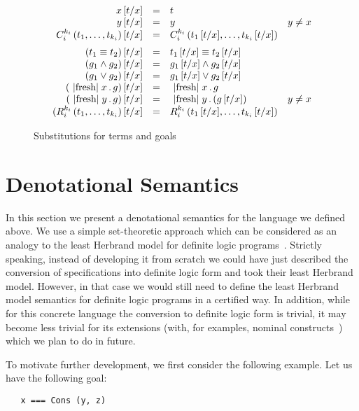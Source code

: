 \begin{figure}[t]
\[
\begin{array}{rcll}
  x\,[t/x] &=& t &\\
  y\,[t/x] &=& y & y\ne x\\
  C_i^{k_i}\,(t_1,\dots,t_{k_i})\,[t/x]&=&C_i^{k_i}\,(t_1\,[t/x],\dots,t_{k_i}\,[t/x])&\\[2mm]
  (t_1 \equiv t_2)\,[t/x]&=&t_1\,[t/x] \equiv t_2\,[t/x]&\\
  (g_1 \wedge g_2)\,[t/x]&=&g_1\,[t/x] \wedge g_2\,[t/x]&\\
  (g_1 \vee g_2)\,[t/x]&=&g_1\,[t/x] \vee g_2\,[t/x]&\\
  (\mbox{\lstinline|fresh|}\;x\,.\,g)\,[t/x]&=&\mbox{\lstinline|fresh|}\;x\,.\,g&\\
  (\mbox{\lstinline|fresh|}\;y\,.\,g)\,[t/x]&=&\mbox{\lstinline|fresh|}\;y\,.\,(g\,[t/x])&y\ne x\\
  (R_i^{k_i}\,(t_1,\dots,t_{k_i})\,[t/x]&=&R_i^{k_i}\,(t_1\,[t/x],\dots,t_{k_i}\,[t/x])&
\end{array}
\]
  \caption{Substitutions for terms and goals}
  \label{substitution}
\end{figure}

\section{Denotational Semantics}
\label{denotational}

In this section we present a denotational semantics for the language we defined above. We use a simple set-theoretic
approach which can be considered as an analogy to the least Herbrand model for definite logic programs~\cite{LHM}.
Strictly speaking, instead of developing it from scratch we could have just described the conversion of specifications
into definite logic form and took their least Herbrand model. However, in that case we would still need to define
the least Herbrand model semantics for definite logic programs in a certified way. In addition, while for
this concrete language the conversion to definite logic form is trivial, it may become less trivial for
its extensions (with, for examples, nominal constructs~\cite{AlphaKanren}) which we plan to do in future.

To motivate further development, we first consider the following example. Let us have the following goal:

\begin{lstlisting}
   x === Cons (y, z)
\end{lstlisting}

